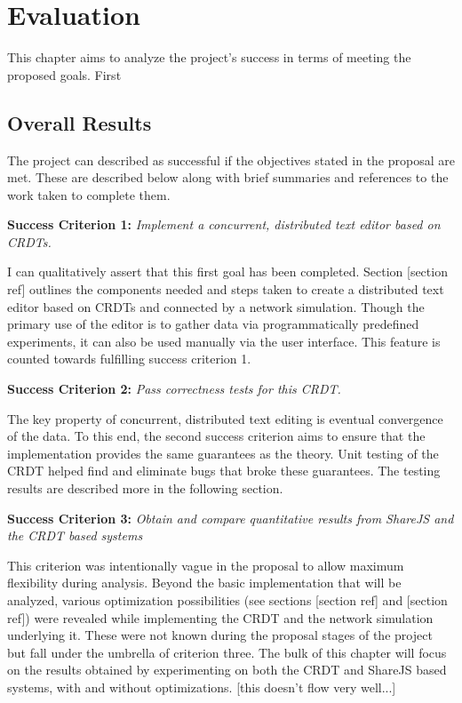 \documentclass[12pt,a4paper,twoside,openright]{report}
\begin{document}
\chapter{Evaluation}
	This chapter aims to analyze the project's success in terms of meeting the proposed goals. First

	\section{Overall Results}
	
	The project can described as successful if the objectives stated in the proposal are met. These are described below along with brief summaries and references to the work taken to complete them.
	
	\textbf{Success Criterion 1:} \textit{Implement a concurrent, distributed text editor based on CRDTs.}
	
	I can qualitatively assert that this first goal has been completed. Section [section ref] outlines the components needed and steps taken to create a distributed text editor based on CRDTs and connected by a network simulation. Though the primary use of the editor is to gather data via programmatically predefined experiments, it can also be used manually via the user interface. This feature is counted towards fulfilling success criterion 1.
	
	\textbf{Success Criterion 2:} \textit{Pass correctness tests for this CRDT.}
	
	The key property of concurrent, distributed text editing is eventual convergence of the data. To this end, the second success criterion aims to ensure that the implementation provides the same guarantees as the theory. Unit testing of the CRDT helped find and eliminate bugs that broke these guarantees. The testing results are described more in the following section.
	

	\textbf{Success Criterion 3:} \textit{Obtain and compare quantitative results from ShareJS and the CRDT based systems}
	
	This criterion was intentionally vague in the proposal to allow maximum flexibility during analysis. Beyond the basic implementation that will be analyzed, various optimization possibilities (see sections [section ref] and [section ref]) were revealed while implementing the CRDT and the network simulation underlying it. These were not known during the proposal stages of the project but fall under the umbrella of criterion three. The bulk of this chapter will focus on the results obtained by experimenting on both the CRDT and ShareJS based systems, with and without optimizations.
	[this doesn't flow very well...]
	
\end{document}
